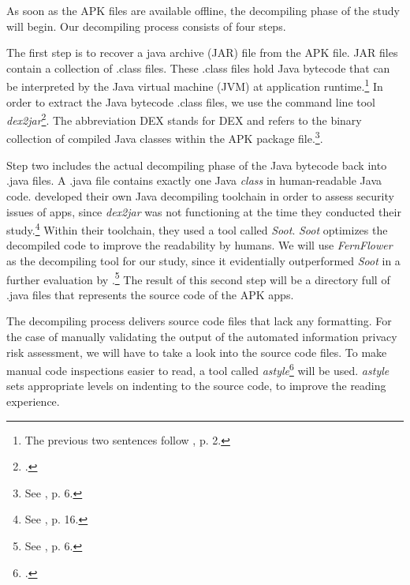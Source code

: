 \documentclass[
	a4paper,
	oneside,
	12pt,
	liststotocnumbered
]{article}
\let\cite\textcite
\begin{document}
As soon as the \acs{APK} files are available offline, the decompiling phase of the study will begin.
Our decompiling process consists of four steps.

The first step is to recover a java archive (\acs{JAR}) file from the \acs{APK} file.
\acs{JAR} files contain a collection of .class files. 
These .class files hold Java bytecode that can be interpreted by the Java virtual machine (\acs{JVM}) at application runtime.\footnote{The previous two sentences follow \cite{Enck2011}, p. 2.} 
In order to extract the Java bytecode .class files, we use the command line tool \textit{dex2jar}\footnote{\cite{Pan2010}.}. 
The abbreviation \acs{DEX} stands for \acl{DEX} and refers to the binary collection of compiled Java classes within the \acs{APK} package file.\footnote{See \cite{xu2013}, p. 6.}.

Step two includes the actual decompiling phase of the Java bytecode back into .java files. 
A .java file contains exactly one Java \textit{class} in human-readable Java code. 
\cite{Enck2011} developed their own Java decompiling toolchain in order to assess security issues of \mH apps, since \textit{dex2jar} was not functioning at the time they conducted their study.\footnote{See \cite{Enck2011}, p. 16.}
Within their toolchain, they used a tool called \textit{Soot}.
\textit{Soot} optimizes the decompiled code to improve the readability by humans.
We will use \textit{FernFlower} as the decompiling tool for our study, since it evidentially outperformed \textit{Soot} in a further evaluation by \cite{Enck2011}.\footnote{See \cite{Enck2011}, p. 6.}
The result of this second step will be a directory full of .java files that represents the source code of the \acs{APK} apps.

The decompiling process delivers source code files that lack any formatting.
For the case of manually validating the output of the automated information privacy risk assessment, we will have to take a look into the source code files. 
To make manual code inspections easier to read, a tool called \textit{astyle}\footnote{\cite{Davidson2006}.} will be used. 
\textit{astyle} sets appropriate levels on indenting to the source code, to improve the reading experience.
\end{document}

